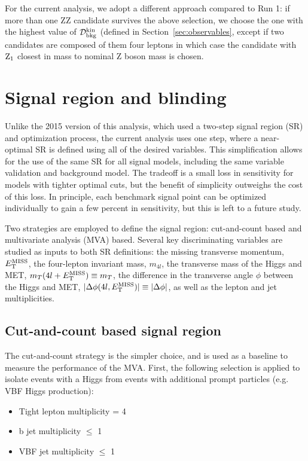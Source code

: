 For the current analysis, we adopt a different approach compared to Run 1: if more than one ZZ candidate survives the above selection,
we choose the one with the highest value of $\KD$ (defined in Section~\ref{sec:observables}, except if
two candidates are composed of them four leptons in which case the candidate with ${\rm Z_1}$ closest in mass to nominal 
Z boson mass is chosen.


\section{Signal region and blinding}

Unlike the 2015 version of this analysis, which used a two-step signal region (SR) and optimization process, the current analysis uses one step, where a near-optimal SR is defined using all of the desired variables. This simplification allows for the use of the same SR for all signal models, including the same variable validation and background model. The tradeoff is a small loss in sensitivity for models with tighter optimal cuts, but the benefit of simplicity outweighs the cost of this loss. In principle, each benchmark signal point can be optimized individually to gain a few percent in sensitivity, but this is left to a future study.

Two strategies are employed to define the signal region: cut-and-count based and multivariate analysis (MVA) based. Several key discriminating variables are studied as inputs to both SR definitions: the missing transverse momentum, $E_{\rm{T}}^{\rm{MISS}}$, the four-lepton invariant mass, $m_{4l}$, the transverse mass of the Higgs and MET, $m_T(4l+E_{\rm{T}}^{\rm{MISS}}) \equiv m_T$, the difference in the transverse angle $\phi$ between the Higgs and MET, $|\Delta\phi(4l, E_{\rm{T}}^{\rm{MISS}})| \equiv |\Delta\phi|$, as well as the lepton and jet multiplicities.

\subsection{Cut-and-count based signal region} \label{cutandcountopt}

The cut-and-count strategy is the simpler choice, and is used as a baseline to measure the performance of the MVA. First, the following selection is applied to isolate events with a Higgs from events with additional prompt particles (e.g. VBF Higgs production):

\begin{itemize}
\item Tight lepton multiplicity = 4
\item b jet multiplicity $\leq$ 1
\item VBF jet multiplicity $\leq$ 1
\end{itemize}

